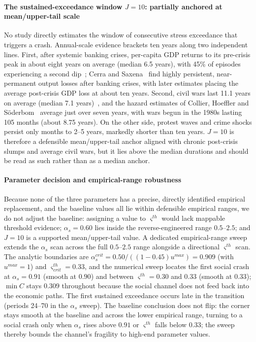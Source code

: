 \documentclass[review,12pt]{elsarticle}
\theoremstyle{plain}
\theoremstyle{definition}
\theoremstyle{remark}
\begin{document}
\paragraph{The sustained-exceedance window $J=10$: partially anchored at mean/upper-tail scale} No study directly estimates the window of consecutive stress exceedance that triggers a crash. Annual-scale evidence brackets ten years along two independent lines. First, after systemic banking crises, per-capita GDP returns to its pre-crisis peak in about eight years on average (median 6.5 years), with 45\% of episodes experiencing a second dip~\cite{RR2014}; Cerra and Saxena~\cite{CS2008} find highly persistent, near-permanent output losses after banking crises, with later estimates placing the average post-crisis GDP loss at about ten years. Second, civil wars last 11.1 years on average (median 7.1 years)~\cite{Fearon2004}, and the hazard estimates of Collier, Hoeffler and S\"oderbom~\cite{CHS2004} average just over seven years, with wars begun in the 1980s lasting 105 months (about 8.75 years). On the other side, protest waves and crime shocks persist only months to 2--5 years, markedly shorter than ten years. $J=10$ is therefore a defensible mean/upper-tail anchor aligned with chronic post-crisis slumps and average civil wars, but it lies above the median durations and should be read as such rather than as a median anchor.

\paragraph{Parameter decision and empirical-range robustness} Because none of the three parameters has a precise, directly identified empirical replacement, and the baseline values all lie within defensible empirical ranges, we do not adjust the baseline: assigning a value to $\varsigma^{th}$ would lack mappable threshold evidence; $\alpha_s=0.60$ lies inside the reverse-engineered range $0.5$--$2.5$; and $J=10$ is a supported mean/upper-tail value. A dedicated empirical-range sweep extends the $\alpha_s$ scan across the full $0.5$--$2.5$ range alongside a directional $\varsigma^{th}$ scan. The analytic boundaries are $\alpha_s^{crit}=0.50/((1-0.45)u^{max})=0.909$ (with $u^{max}=1$) and $\varsigma^{th}_{crit}=0.33$, and the numerical sweep locates the first social crash at $\alpha_s=0.91$ (smooth at $0.90$) and between $\varsigma^{th}=0.30$ and $0.33$ (smooth at $0.33$); $\min C$ stays $0.309$ throughout because the social channel does not feed back into the economic paths. The first sustained exceedance occurs late in the transition (periods 24--70 in the $\alpha_s$ sweep). The baseline conclusion does not flip: the corner stays smooth at the baseline and across the lower empirical range, turning to a social crash only when $\alpha_s$ rises above $0.91$ or $\varsigma^{th}$ falls below $0.33$; the sweep thereby bounds the channel's fragility to high-end parameter values.
\end{document}
